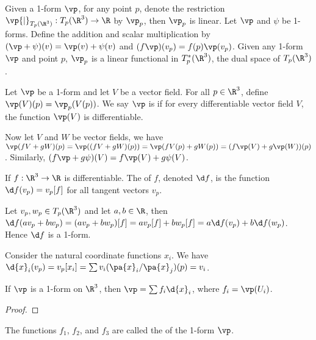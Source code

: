 \documentclass[10pt]{article}
\begin{document}
\par
Given a 1-form $\vp$, for any point $p$, denote the restriction $\vp{\vert}_{{T}_{p}({\R}^{3})}:{T}_{p}({\R}^{3})\to\R$ by ${\vp}_{p}$, then ${\vp}_{p}$ is linear. Let $\vp$ and $\psi$ be 1-forms. Define the addition and scalar multiplication by $(\vp+\psi)(v)=\vp(v)+\psi(v)$ and $(f\vp)({v}_{p})=f(p)\vp({v}_{p})$. Given any 1-form $\vp$ and point $p$, ${\vp}_{p}$ is a linear functional in ${T}_{p}^{*}({\R}^{3})$, the dual space of ${T}_{p}({\R}^{3})$.
\begin{definition}
    Let $\vp$ be a 1-form and let $V$ be a vector field. For all $p\in{\R}^{3}$, define $\vp(V)(p)={\vp}_{p}(V(p))$. We say $\vp$ is  if for every differentiable vector field $V$, the function $\vp(V)$ is differentiable.
\end{definition}
\par
Now let $V$ and $W$ be vector fields, we have $\vp(fV+gW)(p)=\vp((fV+gW)(p))=\vp(fV(p)+gW(p))=(f\vp(V)+g\vp(W))(p)$. Similarly, $(f\vp+g\psi)(V)=f\vp(V)+g\psi(V)$.
\begin{definition}
    If $f:{\R}^{3}\to\R$ is differentiable. The  of $f$, denoted $\d f$, is the function $\d f({v}_{p})={v}_{p}[f]$ for all tangent vectors ${v}_{p}$.
\end{definition}
\par
Let ${v}_{p},{w}_{p}\in{T}_{p}({\R}^{3})$ and let $a,b\in\R$, then $\d f(a{v}_{p}+b{w}_{p})=(a{v}_{p}+b{w}_{p})[f]=a{v}_{p}[f]+b{w}_{p}[f]=a\d f({v}_{p})+b\d f({w}_{p})$. Hence $\d f$ is a 1-form.
\begin{example}
    Consider the natural coordinate functions ${x}_{i}$. We have $\d{x}_{i}({v}_{p})={v}_{p}[{x}_{i}]=\sum{v}_{i}(\pa{x}_{i}/\pa{x}_{j})(p)={v}_{i}$.
\end{example}
\begin{proposition}
    If $\vp$ is a 1-form on ${\R}^{3}$, then $\vp=\sum{f}_{i}\d{x}_{i}$, where ${f}_{i}=\vp({U}_{i})$.
\end{proposition}
\begin{proof}
    
\end{proof}
\par
The functions ${f}_{1}$, ${f}_{2}$, and ${f}_{3}$ are called the  of the 1-form $\vp$.




\hindex
\end{document}
